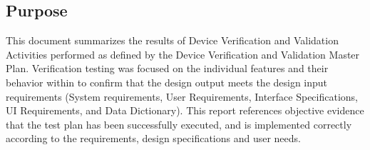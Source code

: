 \subsection{Purpose}
This document summarizes the results of \vssShort{} Device Verification and
Validation Activities performed as defined by the \vssName{} Device Verification 
and Validation Master Plan. Verification testing was focused on the individual 
features and their behavior within \vssShort{} to confirm that the design output 
meets the design input requirements (System requirements, User Requirements, 
Interface Specifications, UI Requirements, and Data Dictionary). This report 
references objective evidence that the test plan has been successfully executed, 
and \vssLong{} is implemented correctly according to the requirements, design 
specifications and user needs.
